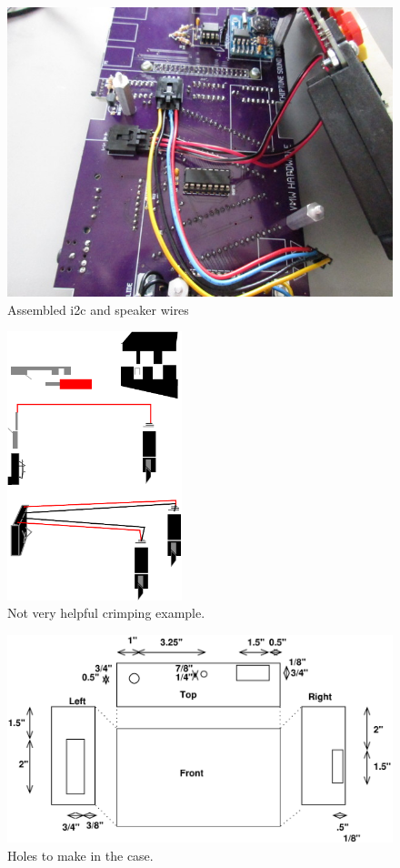 \documentclass[11pt]{article}
\begin{document}
\begin{figure}[tph]
\centering
\includegraphics{figs/0369_wiring.jpg}
\caption{Assembled i2c and speaker wires~\label{figs:wires}}
\end{figure}

\begin{figure}[tph]
\centering
\includegraphics[width=2in]{figs/power_crimp}
\caption{Not very helpful crimping example.~\label{figure:crimping}}
\end{figure}


\begin{figure}[th]
\includegraphics[width=\columnwidth]{figs/holes}
\caption{Holes to make in the case.~\label{figure:holes}}
\end{figure}
\end{document}
